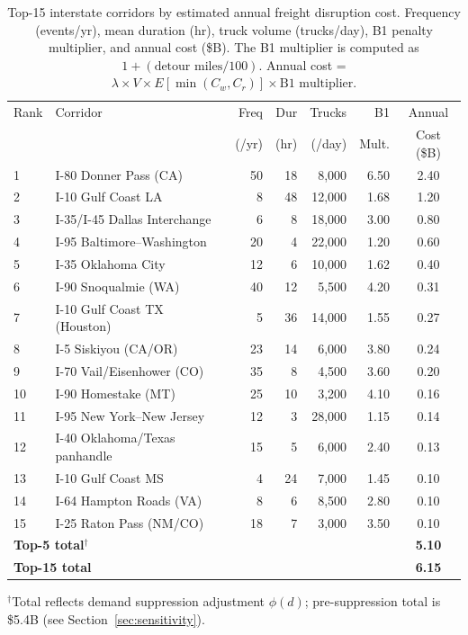 \begin{table}[ht]
\centering
\caption{Top-15 interstate corridors by estimated annual freight disruption cost.
Frequency (events/yr), mean duration (hr), truck volume (trucks/day), B1 penalty
multiplier, and annual cost (\$B). The B1 multiplier is computed as $1 +
(\text{detour miles}/100)$. Annual cost = $\lambda \times V \times E[\min(C_w, C_r)]
\times \text{B1 multiplier}$.}
\label{tab:closure-costs}
\begin{tabular}{@{}llrrrrc@{}}
\toprule
Rank & Corridor & Freq & Dur & Trucks & B1 & Annual \\
     &          & (/yr) & (hr) & (/day) & Mult. & Cost (\$B) \\
\midrule
1  & I-80 Donner Pass (CA)         & 50 & 18 &  8,000 & 6.50 & 2.40 \\
2  & I-10 Gulf Coast LA            &  8 & 48 & 12,000 & 1.68 & 1.20 \\
3  & I-35/I-45 Dallas Interchange  &  6 &  8 & 18,000 & 3.00 & 0.80 \\
4  & I-95 Baltimore--Washington    & 20 &  4 & 22,000 & 1.20 & 0.60 \\
5  & I-35 Oklahoma City            & 12 &  6 & 10,000 & 1.62 & 0.40 \\
6  & I-90 Snoqualmie (WA)          & 40 & 12 &  5,500 & 4.20 & 0.31 \\
7  & I-10 Gulf Coast TX (Houston)  &  5 & 36 & 14,000 & 1.55 & 0.27 \\
8  & I-5 Siskiyou (CA/OR)          & 23 & 14 &  6,000 & 3.80 & 0.24 \\
9  & I-70 Vail/Eisenhower (CO)     & 35 &  8 &  4,500 & 3.60 & 0.20 \\
10 & I-90 Homestake (MT)           & 25 & 10 &  3,200 & 4.10 & 0.16 \\
11 & I-95 New York--New Jersey     & 12 &  3 & 28,000 & 1.15 & 0.14 \\
12 & I-40 Oklahoma/Texas panhandle & 15 &  5 &  6,000 & 2.40 & 0.13 \\
13 & I-10 Gulf Coast MS            &  4 & 24 &  7,000 & 1.45 & 0.10 \\
14 & I-64 Hampton Roads (VA)       &  8 &  6 &  8,500 & 2.80 & 0.10 \\
15 & I-25 Raton Pass (NM/CO)       & 18 &  7 &  3,000 & 3.50 & 0.10 \\
\midrule
\multicolumn{6}{l}{\textbf{Top-5 total}$^{\dagger}$} & \textbf{5.10} \\
\multicolumn{6}{l}{\textbf{Top-15 total}} & \textbf{6.15} \\
\bottomrule
\end{tabular}
\par\smallskip
\noindent\footnotesize{$^{\dagger}$Total reflects demand suppression adjustment $\phi(d)$; pre-suppression total is \$5.4B (see Section~\ref{sec:sensitivity}).}
\end{table}

